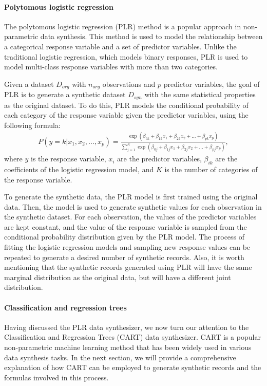 \paragraph{Polytomous logistic regression} The polytomous logistic regression (PLR) method is a popular approach in non-parametric data synthesis. This method is used to model the relationship between a categorical response variable and a set of predictor variables. Unlike the traditional logistic regression, which models binary responses, PLR is used to model multi-class response variables with more than two categories.

Given a dataset $D_{org}$ with $n_{org}$ observations and $p$ predictor variables, the goal of PLR is to generate a synthetic dataset $D_{syn}$ with the same statistical properties as the original dataset. To do this, PLR models the conditional probability of each category of the response variable given the predictor variables, using the following formula:
\begin{align}
    \label{equ:multilogit}
    P(y=k|x_1,x_2,\dots,x_p)=\frac{\exp(\beta_{0k}+\beta_{1k}x_1+\beta_{2k}x_2+\dots + \beta_{pk}x_p)}{\sum_{j=1}^K\exp(\beta_{0j}+\beta_{1j}x_1+\beta_{2j}x_2+\dots + \beta_{pj}x_p)},
\end{align}
where $y$ is the response variable, $x_i$ are the predictor variables, $\beta_{ik}$ are the coefficients of the logistic regression model, and $K$ is the number of categories of the response variable.

To generate the synthetic data, the PLR model is first trained using the original data. Then, the model is used to generate synthetic values for each observation in the synthetic dataset. For each observation, the values of the predictor variables are kept constant, and the value of the response variable is sampled from the conditional probability distribution given by the PLR model. The process of fitting the logistic regression models and sampling new response values can be repeated to generate a desired number of synthetic records. Also, it is worth mentioning that the synthetic records generated using PLR will have the same marginal distribution as the original data, but will have a different joint distribution.


\paragraph{Classification and regression trees}
Having discussed the PLR data synthesizer, we now turn our attention to the Classification and Regression Trees (CART) data synthesizer. CART is a popular non-parametric machine learning method that has been widely used in various data synthesis tasks. In the next section, we will provide a comprehensive explanation of how CART can be employed to generate synthetic records and the formulas involved in this process.

